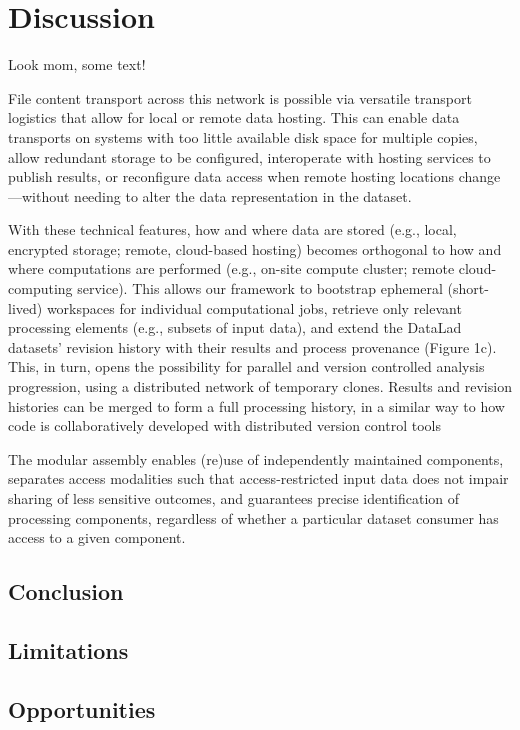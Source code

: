 

\chapter{Discussion}
\label{discussion}

Look mom, some text!



File content transport across this network is possible via versatile transport logistics that allow for local or remote data hosting. This can enable data transports on systems with too little available disk space for multiple copies, allow redundant storage to be configured, interoperate with hosting services to publish results, or reconfigure data access when remote hosting locations change—without needing to alter the data representation in the dataset.

With these technical features, how and where data are stored (e.g., local, encrypted storage; remote, cloud-based hosting) becomes orthogonal to how and where computations are performed (e.g., on-site compute cluster; remote cloud-computing service). This allows our framework to bootstrap ephemeral (short-lived) workspaces for individual computational jobs, retrieve only relevant processing elements (e.g., subsets of input data), and extend the DataLad datasets’ revision history with their results and process provenance (Figure 1c). This, in turn, opens the possibility for parallel and version controlled analysis progression, using a distributed network of temporary clones. Results and revision histories can be merged to form a full processing history, in a similar way to how code is collaboratively developed with distributed version control tools




The modular assembly enables (re)use of independently maintained components, separates access modalities such that access-restricted input data does not impair sharing of less sensitive outcomes, and guarantees precise identification of processing components, regardless of whether a particular dataset consumer has access to a given component.




\section{Conclusion}

\section{Limitations}


\section{Opportunities}


